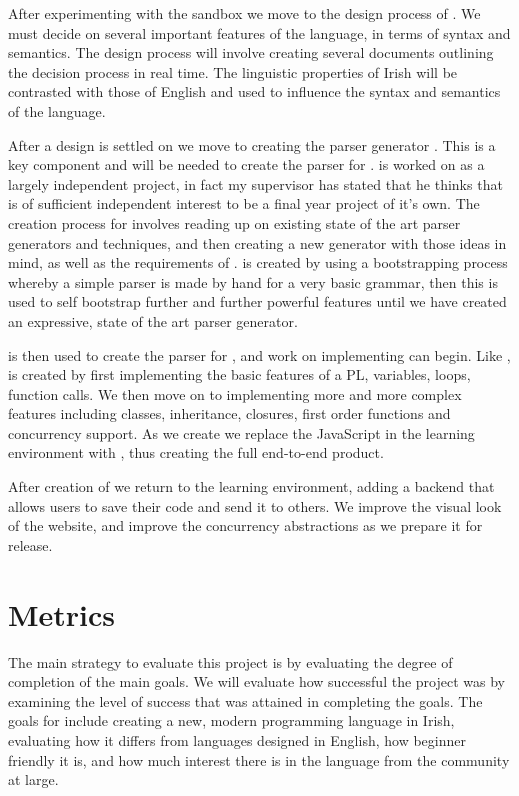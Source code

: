 After experimenting with the sandbox we move to the design process of \Setanta{}. We must decide on several important features of the language, in terms of syntax and semantics. The design process will involve creating several documents outlining the decision process in real time. The linguistic properties of Irish will be contrasted with those of English and used to influence the syntax and semantics of the language.

After a design is settled on we move to creating the parser generator \tsPEG{}. This is a key component and will be needed to create the parser for \Setanta{}. \tsPEG{} is worked on as a largely independent project, in fact my supervisor has stated that he thinks that \tsPEG{} is of sufficient independent interest to be a final year project of it's own. The creation process for \tsPEG{} involves reading up on existing state of the art parser generators and techniques, and then creating a new generator with those ideas in mind, as well as the requirements of \Setanta{}. \tsPEG{} is created by using a bootstrapping process whereby a simple parser is made by hand for a very basic grammar, then this is used to self bootstrap further and further powerful features until we have created an expressive, state of the art parser generator.

\tsPEG{} is then used to create the parser for \Setanta{}, and work on implementing \Setanta{} can begin. Like \tsPEG{}, \Setanta{} is created by first implementing the basic features of a PL, variables, loops, function calls. We then move on to implementing more and more complex features including classes, inheritance, closures, first order functions and concurrency support. As we create \Setanta{} we replace the JavaScript in the learning environment with \Setanta{}, thus creating the full end-to-end product.

After creation of \Setanta{} we return to the learning environment, adding a backend that allows users to save their code and send it to others. We improve the visual look of the website, and improve the concurrency abstractions as we prepare it for release.

\section{Metrics}

The main strategy to evaluate this project is by evaluating the degree of completion of the main goals. We will evaluate how successful the project was by examining the level of success that was attained in completing the goals. The goals for \Setanta{} include creating a new, modern programming language in Irish, evaluating how it differs from languages designed in English, how beginner friendly it is, and how much interest there is in the language from the community at large.

